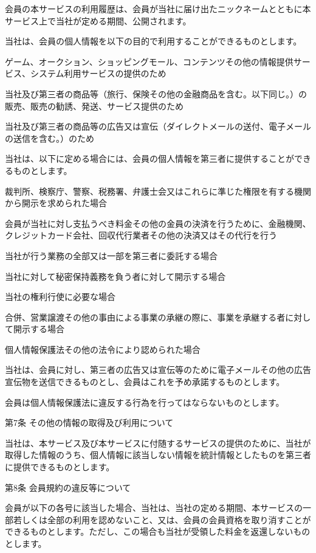     会員の本サービスの利用履歴は、会員が当社に届け出たニックネームとともに本サービス上で当社が定める期間、公開されます。

    当社は、会員の個人情報を以下の目的で利用することができるものとします。

        ゲーム、オークション、ショッピングモール、コンテンツその他の情報提供サービス、システム利用サービスの提供のため

        当社及び第三者の商品等（旅行、保険その他の金融商品を含む。以下同じ。）の販売、販売の勧誘、発送、サービス提供のため

        当社及び第三者の商品等の広告又は宣伝（ダイレクトメールの送付、電子メールの送信を含む。）のため

    当社は、以下に定める場合には、会員の個人情報を第三者に提供することができるものとします。

        裁判所、検察庁、警察、税務署、弁護士会又はこれらに準じた権限を有する機関から開示を求められた場合

        会員が当社に対し支払うべき料金その他の金員の決済を行うために、金融機関、クレジットカード会社、回収代行業者その他の決済又はその代行を行う

        当社が行う業務の全部又は一部を第三者に委託する場合

        当社に対して秘密保持義務を負う者に対して開示する場合

        当社の権利行使に必要な場合

        合併、営業譲渡その他の事由による事業の承継の際に、事業を承継する者に対して開示する場合

        個人情報保護法その他の法令により認められた場合

    当社は、会員に対し、第三者の広告又は宣伝等のために電子メールその他の広告宣伝物を送信できるものとし、会員はこれを予め承諾するものとします。

    会員は個人情報保護法に違反する行為を行ってはならないものとします。

第7条 その他の情報の取得及び利用について

    当社は、本サービス及び本サービスに付随するサービスの提供のために、当社が取得した情報のうち、個人情報に該当しない情報を統計情報としたものを第三者に提供できるものとします。

第8条 会員規約の違反等について

    会員が以下の各号に該当した場合、当社は、当社の定める期間、本サービスの一部若しくは全部の利用を認めないこと、又は、会員の会員資格を取り消すことができるものとします。ただし、この場合も当社が受領した料金を返還しないものとします。

